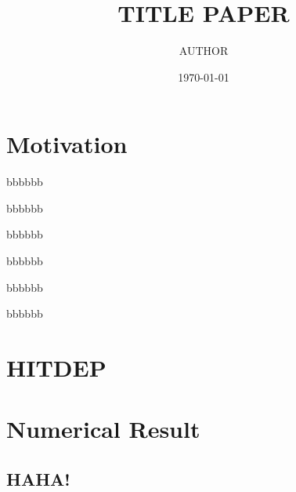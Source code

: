 \documentclass[11pt]{amsart}
\title{TITLE PAPER}
\author{AUTHOR}
\date{\today}
\begin{document}
    \begin{abstract}
    \end{abstract}
    \maketitle


    \section{Motivation}
    \lipsum
    \begin{theorem}
    \end{theorem}

    \begin{corollary}
    \end{corollary}

    \begin{proposition}
        bbbbbb
    \end{proposition}

    \begin{conjecture}
        bbbbbb
    \end{conjecture}

    \begin{lemma}
        bbbbbb
    \end{lemma}

    \begin{definition}
        bbbbbb
    \end{definition}

    \begin{remark}
        bbbbbb
    \end{remark}

    \begin{assumption}
        bbbbbb
    \end{assumption}


    \section{HITDEP}
    \lipsum


    \section{Numerical Result}

    \subsection{HAHA!}
    \lipsum


    \printbibliography[category=cited]%
    \printbibliography[title={Further Reading},notcategory=cited]
    \nocite{*}
\end{document}
